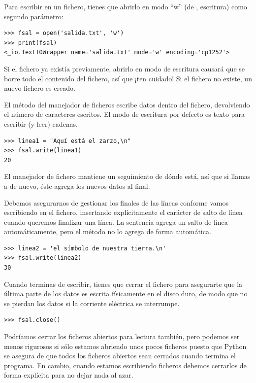 
Para escribir en un fichero, tienes que abrirlo en modo ``w'' (de
, escritura) como segundo parámetro:

\begin{Verbatim}[frame=single]
>>> fsal = open('salida.txt', 'w')
>>> print(fsal)
<_io.TextIOWrapper name='salida.txt' mode='w' encoding='cp1252'>
\end{Verbatim}

Si el fichero ya existía previamente, abrirlo en modo de escritura
causará que se borre todo el contenido del fichero, así que ¡ten
cuidado! Si el fichero no existe, un nuevo fichero es creado.

El método  del manejador de ficheros escribe datos dentro
del fichero, devolviendo el número de caracteres escritos. El modo de
escritura por defecto es texto para escribir (y leer) cadenas.

\begin{Verbatim}[frame=single]
>>> linea1 = "Aquí está el zarzo,\n"
>>> fsal.write(linea1)
20
\end{Verbatim}


El manejador de fichero mantiene un seguimiento de dónde está, así que
si llamas a  de nuevo, éste agrega los nuevos datos al
final.

Debemos asegurarnos de gestionar los finales de las líneas conforme vamos escribiendo en el fichero, insertando explícitamente el carácter
de salto de línea cuando queremos finalizar una línea. La sentencia
 agrega un salto de línea automáticamente, pero el método
 no lo agrega de forma automática.

\begin{Verbatim}[frame=single]
>>> linea2 = 'el símbolo de nuestra tierra.\n'
>>> fsal.write(linea2)
30
\end{Verbatim}

Cuando terminas de escribir, tienes que cerrar el fichero para
asegurarte que la última parte de los datos es escrita físicamente en el
disco duro, de modo que no se pierdan los datos si la corriente
eléctrica se interrumpe.

\begin{Verbatim}[frame=single]
>>> fsal.close()
\end{Verbatim}

Podríamos cerrar los ficheros abiertos para lectura también, pero
podemos ser menos rigurosos si sólo estamos abriendo unos pocos ficheros
puesto que Python se asegura de que todos los ficheros abiertos sean
cerrados cuando termina el programa. En cambio, cuando estamos
escribiendo ficheros debemos cerrarlos de forma explícita para no dejar
nada al azar.


